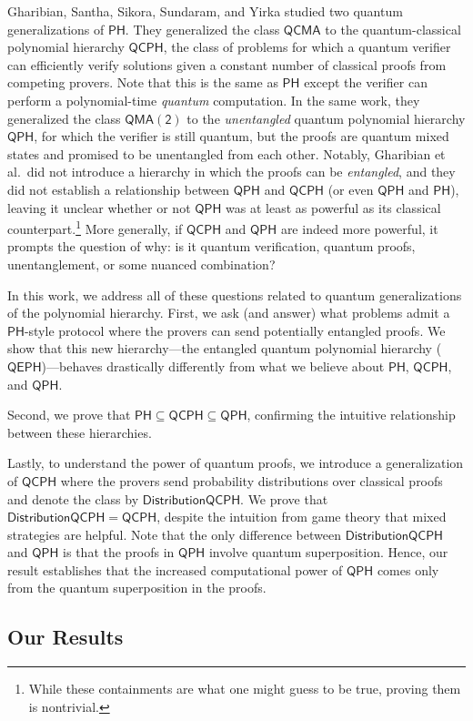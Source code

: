 \documentclass[10pt,a4paper]{article}
\theoremstyle{definition}
\newcommand{\class}[1]{\ensuremath{\mathsf{#1}}\xspace}
\newcommand{\QCMA}{\class{QCMA}}
\newcommand{\QMAk}[1][k]{\class{QMA(#1)}}
\newcommand{\QMAtwo}{\QMAk[2]}
\newcommand{\PH}{\class{PH}}
\newcommand{\QCPH}{\class{QCPH}}
\newcommand{\QPH}{\class{QPH}}
\newcommand{\QEPH}{\class{QEPH}}
\newcommand{\distributionQCPH}{\mathsf{DistributionQCPH}}
\begin{document}
Gharibian, Santha, Sikora, Sundaram, and Yirka \cite{GSSSY22_qph} studied two quantum generalizations of $\PH$. 
They generalized the class $\QCMA$ to the quantum-classical polynomial hierarchy $\QCPH$, the class of problems for which a quantum verifier can efficiently verify solutions given a constant number of classical proofs from competing provers. Note that this is the same as $\PH$ except the verifier can perform a polynomial-time \emph{quantum} computation.
In the same work, they generalized the class $\QMAtwo$ to the \emph{unentangled} quantum polynomial hierarchy $\QPH$, 
for which the verifier is still quantum, but the proofs are quantum mixed states and promised to be unentangled from each other.
Notably, Gharibian et al.\ did not introduce a hierarchy in which the proofs can be \emph{entangled}, and they did not establish a relationship between $\QPH$ and $\QCPH$ (or even $\QPH$ and $\PH$), leaving it unclear whether or not $\QPH$ was at least as powerful as its classical counterpart.\footnote{While these containments are what one might guess to be true, proving them is nontrivial.} 
More generally, if $\QCPH$ and $\QPH$ are indeed more powerful, it prompts the question of why: is it quantum verification, quantum proofs, unentanglement, or some nuanced combination?

In this work, we address all of these questions related to quantum generalizations of the polynomial hierarchy.
First, we ask (and answer) what problems admit a $\PH$-style protocol where the provers can send potentially entangled proofs. 
We show that this new hierarchy---the entangled quantum polynomial hierarchy ($\QEPH$)---behaves drastically differently from what we believe about $\PH$, $\QCPH$, and $\QPH$.

Second, we prove that $\PH \subseteq \QCPH \subseteq \QPH$, 
confirming the intuitive relationship between these hierarchies. 

Lastly, to understand the power of quantum proofs, we introduce a generalization of $\QCPH$ where the provers send probability distributions over classical proofs and denote the class by $\distributionQCPH$. 
We prove that $\distributionQCPH = \QCPH$, despite the intuition from game theory that mixed strategies are helpful.
Note that the only difference between $\distributionQCPH$ and $\QPH$ is that the proofs in $\QPH$ involve quantum superposition.
Hence, our result establishes that the increased computational power of $\QPH$ comes only from the quantum superposition in the proofs. 


\subsection{Our Results}
\end{document}
